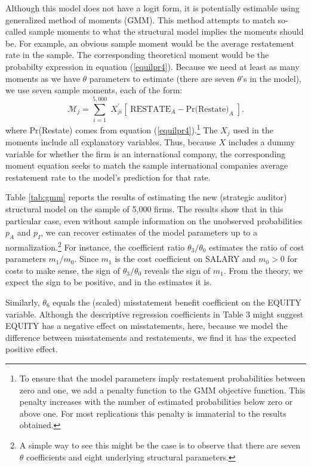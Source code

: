Although this model does not have a logit form, it is potentially estimable using 
generalized method of moments (GMM).
This method attempts to match so-called sample moments to what the structural model implies the moments should be. 
For example, an obvious sample moment would be the average restatement rate in the sample.
The corresponding theoretical moment would be the probabilty expression in equation (\ref{equilpr4}).
Because we need at least as many moments as we have $\theta$ parameters to estimate (there are seven $\theta$'s in the model), we use seven sample moments, each of the form:
$$ \mathcal{M}_j = \sum_{i=1}^{5,000} \; X_{ji}^\prime\left[\; \mbox{RESTATE}_A - \mbox{Pr(Restate)}_A \; \right]. $$
where Pr(Restate) comes from equation (\ref{equilpr4}).\footnote{
To ensure that the model parameters imply restatement probabilities between zero and one, we add a penalty function to the GMM objective function.
This penalty increases with the number of estimated probabilities below zero or above one.
For most replications this penalty is immaterial to the results obtained.} 
The $X_j$ used in the moments include all explanatory variables. 
Thus, because $X$ includes  a dummy variable for whether the firm is an international company, the corresponding moment equation seeks to match the sample international companies average restatement rate to the model's prediction for that rate.

Table \ref{tab:gmm} reports the results of estimating the new (strategic auditor) structural model on the sample of 5,000 firms. 
The results show that in this particular case, even without sample information on the unobserved probabilities $p_A$ and $p_I$, we can recover estimates of the model parameters up to a normalization.\footnote{
A simple way to see this might be the case is to observe that there are seven $\theta$ coefficients and eight underlying structural parameters.} 
For instance, the coefficient ratio $\theta_3/\theta_0$ estimates the ratio of cost parameters $m_1/m_0$.
Since $m_1$ is the cost coefficient on SALARY and $m_0>0$ for costs to make sense, the sign of $\theta_3/\theta_0$ reveals the sign of $m_1$.
From the theory, we expect the sign to be positive, and in the estimates it is. 

Similarly, $\theta_6$ equals the (scaled) misstatement benefit coefficient on the EQUITY variable.
Although the descriptive regression coefficients in Table 3 might suggest EQUITY has a negative effect on misstatements, here, because we model the difference between misstatements and restatements, we find it has the expected positive effect.


